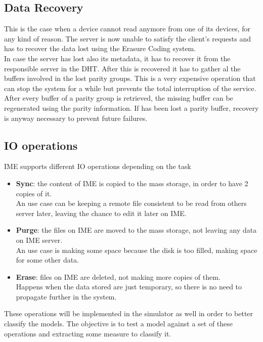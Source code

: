 \subsection{Data Recovery}
This is the case when a device cannot read anymore from one of its devices, for
any kind of reason. The server is now unable to satisfy the client's requests
and has to recover the data lost using the Erasure Coding system. \\
In case the server has lost also its metadata, it has to recover it from the
responsible server in the DHT. After this is recovered it has to gather al the
buffers involved in the lost parity groups. This is a very expensive operation
that can stop the system for a while but prevents the total interruption of the
service. \\
After every buffer of a parity group is retrieved, the missing buffer can be
regenerated using the parity information. If has been lost a parity buffer,
recovery is anyway necessary to prevent future failures.

\subsection{IO operations}
IME supports different IO operations depending on the task
\begin{itemize}
    \item \textbf{Sync}: the content of IME is copied to the mass storage, in
        order to have 2 copies of it. \\
        An use case can be keeping a remote file consistent to be read from
        others server later, leaving the chance to edit it later on IME.
    \item \textbf{Purge}: the files on IME are moved to the mass storage, not
        leaving any data on IME server. \\
        An use case is making some space because the disk is too filled, making
        space for some other data.
    \item \textbf{Erase}: files on IME are deleted, not making more copies of
        them. \\
        Happens when the data stored are just temporary, so there is no need to
        propagate further in the system.
\end{itemize}

These operations will be implemented in the simulator as well in order to better
classify the models. The objective is to test a model against a set of these
operations and extracting some measure to classify it.
